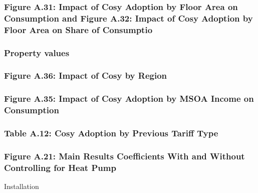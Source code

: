 \documentclass[
]{article}
\begin{document}
\subsubsection{Figure A.31: Impact of Cosy Adoption by Floor Area on Consumption and Figure A.32: Impact of Cosy Adoption by Floor Area on Share of Consumptio}\label{figure-a.31-impact-of-cosy-adoption-by-floor-area-on-consumption-and-figure-a.32-impact-of-cosy-adoption-by-floor-area-on-share-of-consumptio}

\subsubsection{Property values}\label{property-values}

\subsubsection{Figure A.36: Impact of Cosy by Region}\label{figure-a.36-impact-of-cosy-by-region}

\subsubsection{Figure A.35: Impact of Cosy Adoption by MSOA Income on Consumption}\label{figure-a.35-impact-of-cosy-adoption-by-msoa-income-on-consumption}

\subsubsection{Table A.12: Cosy Adoption by Previous Tariff Type}\label{table-a.12-cosy-adoption-by-previous-tariff-type-1}

\subsubsection{Figure A.21: Main Results Coefficients With and Without Controlling for Heat Pump}\label{figure-a.21-main-results-coefficients-with-and-without-controlling-for-heat-pump}

Installation
\end{document}
